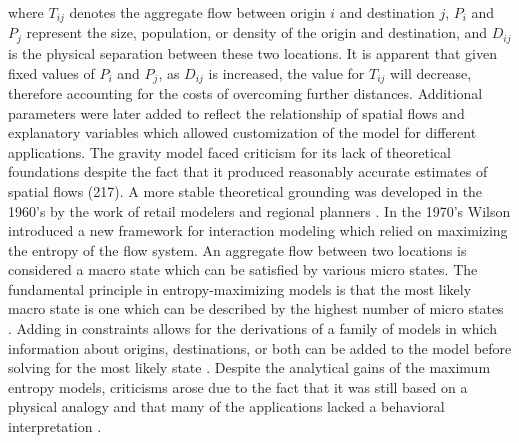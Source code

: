 \documentclass[12pt,a4paper]{thesis}
\begin{document}
where $T_{ij}$ denotes the aggregate flow between origin $i$ and destination $j$, $P_{i}$ and $P_{j}$ represent the size, population, or density of the origin and destination, and $D_{ij}$ is the physical separation between these two locations. It is apparent that given fixed values of $P_{i}$ and $P_{j}$, as $D_{ij}$ is increased, the value for $T_{ij}$ will decrease, therefore accounting for the costs of overcoming further distances. Additional parameters were later added to reflect the relationship of spatial flows and explanatory variables \cite[216]{FotBruCha02} which allowed customization of the model for different applications.  The gravity model faced criticism for its lack of theoretical foundations despite the fact that it produced reasonably accurate estimates of spatial flows (217).  A more stable theoretical grounding was developed in the 1960's by the work of retail modelers and regional planners \cite[2]{RoyThi04}. In the 1970's Wilson introduced a new framework for interaction modeling which relied on maximizing the entropy of the flow system. An aggregate flow between two locations is considered a macro state which can be satisfied by various micro states. The fundamental principle in entropy-maximizing models is that the most likely macro state is one which can be described by the highest number of micro states \cite[17-19]{FotBruCha02}. Adding in constraints allows for the derivations of a family of models in which information about origins, destinations, or both can be added to the model before solving for the most likely state \cite[4]{Wil10}. Despite the analytical gains of the maximum entropy models, criticisms arose due to the fact that it was still based on a physical analogy and that many of the applications lacked a behavioral interpretation \citep{Oke04}.
\end{document}
